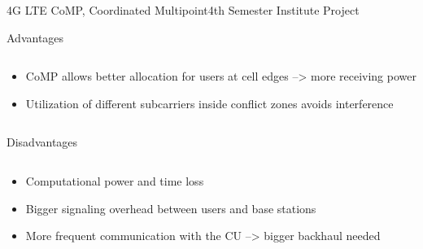 \documentclass[xcolor={cmyk}]{beamer}
\begin{document}
 \begin{frame}{4G LTE CoMP, Coordinated Multipoint}{4th Semester Institute Project}
	 \begin{block}{Advantages}
	 	\begin{columns}
			\begin{column}{.9\textwidth}
				\begin{itemize}
					\item CoMP allows better allocation for users at cell edges --> more receiving power
					\item Utilization of different subcarriers inside conflict zones avoids interference
				\end{itemize}
			\end{column}
		\end{columns}
	 \end{block}
	 \begin{block}{Disadvantages}
	 	\begin{columns}
			\begin{column}{.9\textwidth}
				\begin{itemize}
					\item Computational power and time loss
					\item Bigger signaling overhead between users and base stations
					\item More frequent communication with the CU --> bigger backhaul needed
				\end{itemize}
			\end{column}
		\end{columns}
	 \end{block}
 \end{frame}
\end{document}
